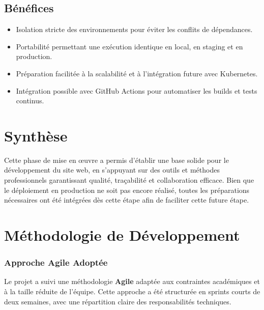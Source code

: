 \documentclass[12pt]{rapportPfe}
\begin{document}
\subsection{Bénéfices}

\begin{itemize}
    \item Isolation stricte des environnements pour éviter les conflits de dépendances.
    \item Portabilité permettant une exécution identique en local, en staging et en production.
    \item Préparation facilitée à la scalabilité et à l’intégration future avec Kubernetes.
    \item Intégration possible avec GitHub Actions pour automatiser les builds et tests continus.
\end{itemize}

\section{Synthèse}

Cette phase de mise en œuvre a permis d'établir une base solide pour le développement du site web, en s'appuyant sur des outils et méthodes professionnels garantissant qualité, traçabilité et collaboration efficace. Bien que le déploiement en production ne soit pas encore réalisé, toutes les préparations nécessaires ont été intégrées dès cette étape afin de faciliter cette future étape.

\section{Méthodologie de Développement}
\subsubsection{Approche Agile Adoptée}
Le projet a suivi une méthodologie \textbf{Agile} adaptée aux contraintes académiques et à la taille réduite de l'équipe. Cette approche a été structurée en sprints courts de deux semaines, avec une répartition claire des responsabilités techniques.
\end{document}
